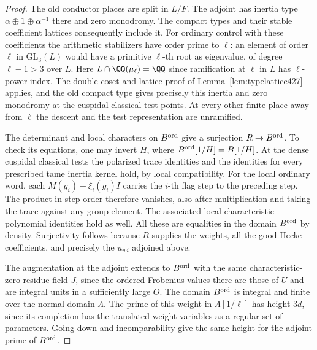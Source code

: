 \documentclass[a4paper,11pt]{article}
\theoremstyle{definition}
\theoremstyle{remark}
\numberwithin{equation}{section}
\begin{document}
\begin{proof}
The old conductor places are split in \(L/F\). The adjoint
has inertia type \(\alpha\oplus1\oplus\alpha^{-1}\) there
and zero monodromy. The compact types and their stable
coefficient lattices consequently include it. For ordinary
control with these coefficients the arithmetic stabilizers
have order prime to \(\ell\): an element of order \(\ell\)
in \(\mathrm{GL}_3(L)\) would have a primitive \(\ell\)-th
root as eigenvalue, of degree \(\ell-1>3\) over \(L\).
Here \(L\cap\QQ(\mu_\ell)=\QQ\) since ramification at
\(\ell\) in \(L\) has \(\ell\)-power index. The double-coset
and lattice proof of Lemma~\ref{lem:typelattice427} applies,
and the old compact type gives precisely this inertia and
zero monodromy at the cuspidal classical test points.
At every other finite place away from \(\ell\) the descent
and the test representation are unramified.

The determinant and local characters on \(B^{\rm ord}\)
give a surjection \(R\to B^{\rm ord}\). To check its
equations, one may invert \(H\), where
\(B^{\rm ord}[1/H]=B[1/H]\). At the dense cuspidal classical
tests the polarized trace identities and the identities
for every prescribed tame inertia kernel hold, by local
compatibility. For the local ordinary word,
each \(M(g_i)-\xi_i(g_i)I\) carries the \(i\)-th flag step
to the preceding step. The product in step order therefore
vanishes, also after multiplication and taking the trace
against any group element. The associated local characteristic
polynomial identities hold as well. All these are equalities
in the domain \(B^{\rm ord}\) by density. Surjectivity follows
because \(R\) supplies the weights, all the good Hecke
coefficients, and precisely the \(u_{wi}\) adjoined above.

The augmentation at the adjoint extends to \(B^{\rm ord}\)
with the same characteristic-zero residue field \(J\), since
the ordered Frobenius values there are those of \(U\) and
are integral units in a sufficiently large \(O\). The domain
\(B^{\rm ord}\) is integral and finite over the normal domain
\(\Lambda\). The prime of this weight in
\(\Lambda[1/\ell]\) has height \(3d\), since its completion
has the translated weight variables as a regular set of
parameters. Going down and incomparability give the same
height for the adjoint prime of \(B^{\rm ord}\).


\end{proof}
\end{document}
